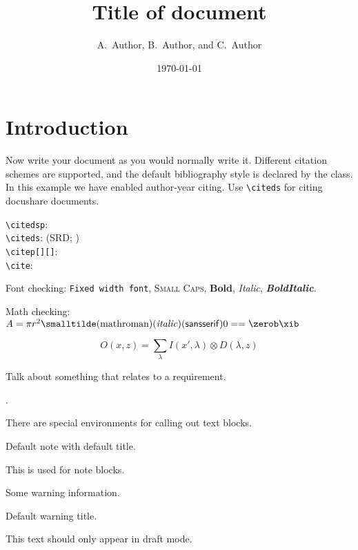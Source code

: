 \documentclass[DM,lsstdraft,authoryear,toc]{lsstdoc}
\title[Short title]{Title of document}
\author{
A.~Author,
B.~Author,
and
C.~Author}
\date{\today}
\begin{document}
\maketitle

\section{Introduction}

Now write your document as you would normally write it.
Different citation schemes are supported, and the default bibliography style is declared by the class.
In this example we have enabled author-year citing.
Use \verb|\citeds| for citing docushare documents.

\verb|\citedsp|:  \\
\verb|\citeds|: (SRD; ) \\
\verb|\citep[][]|: \citep[e.g.,][are interesting]{2009arXiv0912.0201L,2016SPIE.9913E..0GJ} \\
\verb|\cite|: \cite{LPM-51,Wang:2011:QDS:2063348.2063364}

Font checking: \texttt{Fixed width font}, \textsc{Small Caps}, \textbf{Bold}, \textit{Italic}, \textbf{\textit{BoldItalic}}.

Math checking: $A = \pi r^2 \smalltilde\mathrm{(math roman)}\mathit{(italic)}\mathsf{(sans serif)} 0 == \zerob \xib$

\begin{equation}
O(x, z) = \sum_\lambda I(x',\lambda) \otimes D(\lambda, z)
\end{equation}

Talk about something that relates to a requirement.

 .

There are special environments for calling out text blocks.

\begin{note}
  Default note with default title.
\end{note}

\begin{note}
  This is used for note blocks.
\end{note}

\begin{warning}[Scary]
  Some warning information.
\end{warning}

\begin{warning}
  Default warning title.
\end{warning}

\begin{draftnote}
  This text should only appear in draft mode.
\end{draftnote}


\end{document}
